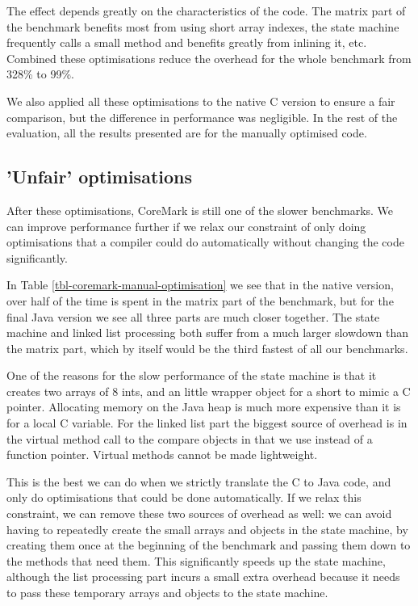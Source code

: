 The effect depends greatly on the characteristics of the code. The matrix part of the benchmark benefits most from using short array indexes, the state machine frequently calls a small method and benefits greatly from inlining it, etc. Combined these optimisations reduce the overhead for the whole benchmark from 328\% to 99\%.

We also applied all these optimisations to the native C version to ensure a fair comparison, but the difference in performance was negligible. In the rest of the evaluation, all the results presented are for the manually optimised code.

\subsection{'Unfair' optimisations}
\label{sec-evaluation-coremark-unfair-optimisations}
After these optimisations, CoreMark is still one of the slower benchmarks. We can improve performance further if we relax our constraint of only doing optimisations that a compiler could do automatically without changing the code significantly.

In Table \ref{tbl-coremark-manual-optimisation} we see that in the native version, over half of the time is spent in the matrix part of the benchmark, but for the final Java version we see all three parts are much closer together. The state machine and linked list processing both suffer from a much larger slowdown than the matrix part, which by itself would be the third fastest of all our benchmarks.

One of the reasons for the slow performance of the state machine is that it creates two arrays of 8 ints, and an little wrapper object for a short to mimic a C pointer. Allocating memory on the Java heap is much more expensive than it is for a local C variable. For the linked list part the biggest source of overhead is in the virtual method call to the compare objects in  that we use instead of a function pointer. Virtual methods cannot be made lightweight.

This is the best we can do when we strictly translate the C to Java code, and only do optimisations that could be done automatically. If we relax this constraint, we can remove these two sources of overhead as well: we can avoid having to repeatedly create the small arrays and objects in the state machine, by creating them once at the beginning of the benchmark and passing them down to the methods that need them. This significantly speeds up the state machine, although the list processing part incurs a small extra overhead because it needs to pass these temporary arrays and objects to the state machine.

